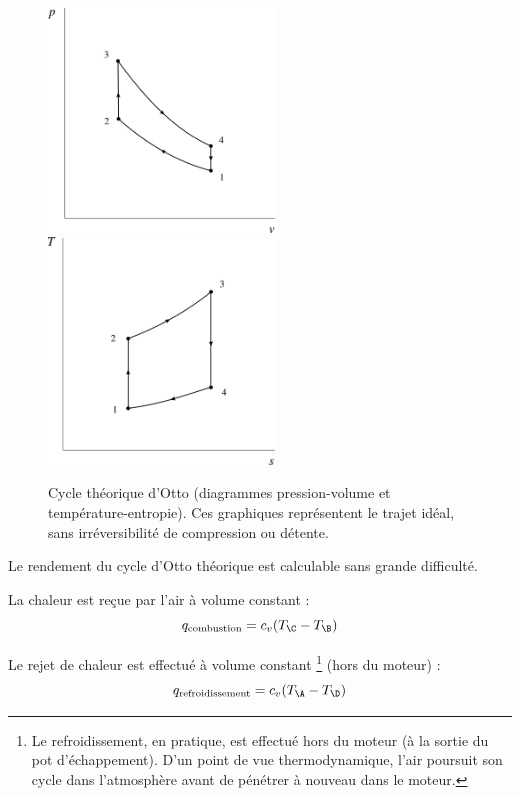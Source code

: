 		\begin{figure}
			\begin{center}
				\includegraphics[width=6cm]{images/pv_gp_otto.png}
				\includegraphics[width=6cm]{images/ts_gp_otto.png}
			\end{center}
			\caption{Cycle théorique d’Otto (diagrammes pression-volume et température-entropie).
			Ces graphiques représentent le trajet idéal, sans irréversibilité de compression ou détente.}
			\label{fig_cycle_otto}
		\end{figure}

		Le rendement du cycle d’Otto théorique est calculable sans grande difficulté.

		La chaleur est reçue par l’air à volume constant :
		\begin{equation}
			q_\text{combustion} = c_v (T_\C - T_\B )
		\end{equation}

		Le rejet de chaleur est effectué à volume constant%
			\footnote{Le refroidissement, en pratique, est effectué hors du moteur (à la sortie du pot d’échappement). D’un point de vue thermodynamique, l’air poursuit son cycle dans l’atmosphère avant de pénétrer à nouveau dans le moteur.}
		(hors du moteur) :
		\begin{equation}
			q_{\text{refroidissement}} = c_v (T_\A - T_\D)
		\end{equation}

